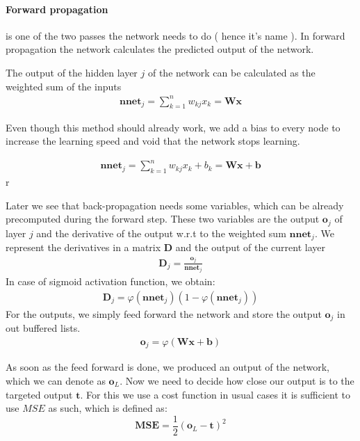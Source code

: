 \paragraph{Forward propagation} is one of the two passes the network needs to do ( hence it's name ).
In forward propagation the network calculates the predicted output of the network.

The output of the hidden layer $j$ of the network can be calculated as the weighted sum of the inputs
\begin{align}
\mathbf{nnet}_j = \sum_{k=1}^{n}w_{kj}x_k = \mathbf{W} \mathbf{x}
\end{align}

Even though this method should already work, we add a bias to every node to increase the learning speed and void that the network stops learning.

\begin{align}
\mathbf{nnet}_j = \sum_{k=1}^{n}w_{kj}x_k + b_k = \mathbf{W} \mathbf{x} + \mathbf{b}
\end{align}r


Later we see that back-propagation needs some variables, which can be already precomputed during the forward step. These two variables are the output $\mathbf{o}_j$ of layer $j$ and the derivative of the output w.r.t to the weighted sum $\mathbf{nnet}_j$. We represent the derivatives in a matrix $\mathbf{D}$ and the output of the current layer 
\begin{align}
\mathbf{D}_j = \frac{\mathbf{o}_j}{\mathbf{nnet}_j}
\end{align}
In case of sigmoid activation function, we obtain:
\begin{align}
\mathbf{D}_j = \varphi \left( \mathbf{nnet}_j \right) \left( 1 - \varphi \left(\mathbf{nnet}_j \right) \right)
\end{align}
For the outputs, we simply feed forward the network and store the output $\mathbf{o}_j$ in out buffered lists.
\begin{align}
\mathbf{o}_j = \varphi \left( \mathbf{Wx+b} \right)
\end{align}

As soon as the feed forward is done, we produced an output of the network, which we can denote as $\mathbf{o}_L$. Now we need to decide how close our output is to the targeted output $\mathbf{t}$. For this we use a cost function in usual cases it is sufficient to use $MSE$ as such, which is defined as:
\begin{equation}
\label{eq:mse}
\mathbf{MSE} = \frac{1}{2} \left( \mathbf{o}_L - \mathbf{t} \right) ^2
\end{equation}

